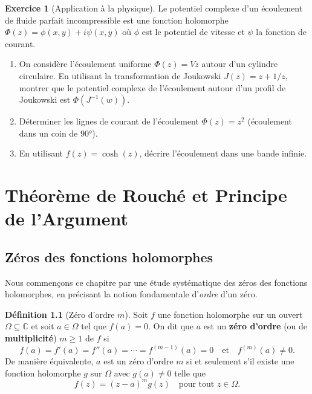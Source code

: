 \documentclass[12pt,a4paper,openany]{book}
\theoremstyle{definition}
\newtheorem{definition}{Définition}[chapter]
\newtheorem{exercice}{Exercice}[chapter]
\theoremstyle{plain}
\theoremstyle{remark}
\newcommand{\C}{\mathbb{C}}
\begin{document}
\begin{exercice}[Application à la physique]\label{exo:phys-conforme}
Le potentiel complexe d'un écoulement de fluide parfait incompressible est une
fonction holomorphe $\Phi(z) = \phi(x,y) + i\psi(x,y)$ où $\phi$ est le potentiel
de vitesse et $\psi$ la fonction de courant.

\begin{enumerate}[label=\alph*)]
  \item On considère l'écoulement uniforme $\Phi(z) = Vz$ autour d'un cylindre
    circulaire. En utilisant la transformation de Joukowski $J(z) = z + 1/z$,
    montrer que le potentiel complexe de l'écoulement autour d'un profil de
    Joukowski est $\Phi(J^{-1}(w))$.
  \item Déterminer les lignes de courant de l'écoulement $\Phi(z) = z^2$
    (écoulement dans un coin de $90°$).
  \item En utilisant $f(z) = \cosh(z)$, décrire l'écoulement dans une bande
    infinie.
\end{enumerate}
\end{exercice}
\chapter{Théorème de Rouché et Principe de l'Argument}\label{ch:rouche-argument}

\section{Zéros des fonctions holomorphes}\label{sec:zeros-holomorphes}

Nous commençons ce chapitre par une étude systématique des zéros des fonctions
holomorphes, en précisant la notion fondamentale d'\emph{ordre} d'un zéro.

\begin{definition}[Zéro d'ordre $m$]\label{def:zero-ordre}
Soit $f$ une fonction holomorphe sur un ouvert $\Omega \subseteq \C$ et soit
$a \in \Omega$ tel que $f(a) = 0$. On dit que $a$ est un \textbf{zéro d'ordre}
(ou de \textbf{multiplicité}) $m \geq 1$
de $f$ si
\[
  f(a) = f'(a) = f''(a) = \cdots = f^{(m-1)}(a) = 0
  \quad \text{et} \quad f^{(m)}(a) \neq 0.
\]
De manière équivalente, $a$ est un zéro d'ordre $m$ si et seulement s'il existe
une fonction holomorphe $g$ sur $\Omega$ avec $g(a) \neq 0$ telle que
\[
  f(z) = (z - a)^m g(z) \quad \text{pour tout } z \in \Omega.
\]
\end{definition}
\end{document}
